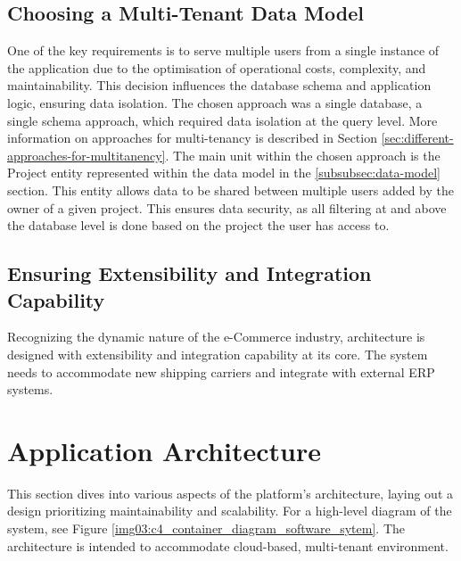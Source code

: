 \subsection{Choosing a Multi-Tenant Data Model}
One of the key requirements is to serve multiple users from a single instance of the application due to the optimisation of operational costs, complexity, and maintainability.
This decision influences the database schema and application logic, ensuring data isolation.
The chosen approach was a single database, a single schema approach, which required data isolation at the query level. More information on approaches for multi-tenancy is described in Section \ref{sec:different-approaches-for-multitanency}.
The main unit within the chosen approach is the Project entity represented within the data model in the \ref{subsubsec:data-model} section.
This entity allows data to be shared between multiple users added by the owner of a given project.
This ensures data security, as all filtering at and above the database level is done based on the project the user has access to.


\subsection{Ensuring Extensibility and Integration Capability}
Recognizing the dynamic nature of the e-Commerce industry, architecture is designed with extensibility and integration capability at its core. 
The system needs to accommodate new shipping carriers and integrate with external \ac{ERP} systems.


\section{Application Architecture}
\label{sec:application-architecture}
This section dives into various aspects of the platform's architecture, laying out a design prioritizing maintainability and scalability. For a high-level diagram of the system, see Figure \ref{img03:c4_container_diagram_software_sytem}.
The architecture is intended to accommodate cloud-based, multi-tenant environment.


